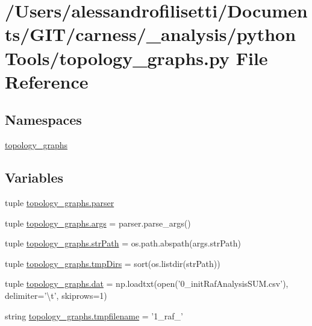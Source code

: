 \hypertarget{a00101}{\section{/\+Users/alessandrofilisetti/\+Documents/\+G\+I\+T/carness/\+\_\+analysis/python\+Tools/topology\+\_\+graphs.py File Reference}
\label{a00101}
}
\subsection*{Namespaces}
\begin{DoxyCompactItemize}
\item 
 \hyperlink{a00160}{topology\+\_\+graphs}
\end{DoxyCompactItemize}
\subsection*{Variables}
\begin{DoxyCompactItemize}
\item 
tuple \hyperlink{a00160_ae8f5442ee1adf5cb74402ea355fa8624}{topology\+\_\+graphs.\+parser}
\item 
tuple \hyperlink{a00160_a24c8c694ace179f28bd0178c8a98cc1f}{topology\+\_\+graphs.\+args} = parser.\+parse\+\_\+args()
\item 
tuple \hyperlink{a00160_a700aee16b39b4ad2a88c4ad9b2595a7c}{topology\+\_\+graphs.\+str\+Path} = os.\+path.\+abspath(args.\+str\+Path)
\item 
tuple \hyperlink{a00160_a8eb5b4fb2ce4eb5e86f9fa6b5ba89ce8}{topology\+\_\+graphs.\+tmp\+Dirs} = sort(os.\+listdir(str\+Path))
\item 
tuple \hyperlink{a00160_a0bffd0371cf5a2357be1b52798816c2c}{topology\+\_\+graphs.\+dat} = np.\+loadtxt(open('0\+\_\+init\+Raf\+Analysis\+S\+U\+M.\+csv'), delimiter='\textbackslash{}t', skiprows=1)
\item 
string \hyperlink{a00160_a7c33855a7bcf13e566f1b8026065fa90}{topology\+\_\+graphs.\+tmpfilename} = '1\+\_\+raf\+\_\+'
\end{DoxyCompactItemize}
